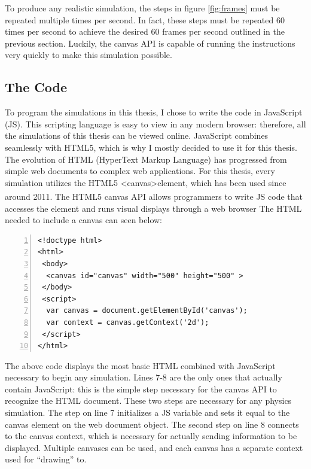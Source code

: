 To produce any realistic simulation, the steps in figure \ref{fig:frames} must be repeated multiple times per second.  In fact, these steps must be repeated 60 times per second to achieve the desired 60 frames per second outlined in the previous section.  Luckily, the canvas API is capable of running the instructions very quickly to make this simulation possible.  










\subsection{The Code}

To program the simulations in this thesis, I chose to write the code in JavaScript (JS).  This scripting language is easy to view in any modern browser: therefore, all the simulations of this thesis can be viewed online.  JavaScript combines seamlessly with HTML5, which is why I mostly decided to use it for this thesis.  The evolution of HTML (HyperText Markup Language) has progressed from simple web documents to complex web applications.  For this thesis, every simulation utilizes the HTML5 \textless canvas\textgreater element, which has been used since around 2011.\textsuperscript{\cite{basichtml5}}  The HTML5 canvas API allows programmers to write JS code that accesses the element and runs visual displays through a web browser  The HTML needed to include a canvas can seen below:



\vspace{1cm}
\begin{lstlisting}[breaklines=true, frame=single, numbers=left, caption= The bare bones code necessary for an HTML document to include the canvas element.  The canvas in this situation is a 500 pixel square., label=lst:basichtml]  
<!doctype html>
<html>
 <body>
  <canvas id="canvas" width="500" height="500" >  
 </body>
 <script>
  var canvas = document.getElementById('canvas');
  var context = canvas.getContext('2d');
 </script>
</html>

\end{lstlisting}

The above code displays the most basic HTML combined with JavaScript necessary to begin any simulation.  Lines 7-8 are the only ones that actually contain JavaScript: this is the simple step necessary for the canvas API to recognize the HTML document.  These two steps are necessary for any physics simulation.  The step on line 7 initializes a JS variable and sets it equal to the canvas element on the web document object.  The second step on line 8 connects to the canvas context, which is necessary for actually sending information to be displayed.  Multiple canvases can be used, and each canvas has a separate context used for ``drawing'' to. 

